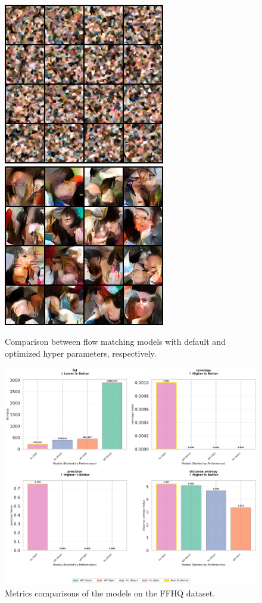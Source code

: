 \documentclass{article}
\begin{document}
\begin{figure}[tb]
    \includegraphics[width=0.5\linewidth]{images/generated_samples/flow_matching_ffhq_default_epoch=981-train_loss=0.24.ckpt_final_images}
    \includegraphics[width=0.5\linewidth]{images/generated_samples/flow_matching_ffhq_optim_epoch=35-train_loss=0.16.ckpt_final_images}
    \caption{Comparison between flow matching models with default and optimized hyper parameters, respectively.}
    \label{fig:flow_matching}
\end{figure}

\begin{figure}[tb]
    \includegraphics[width=\linewidth]{images/final_results/selected_metrics_comparison}
    \caption{Metrics comparisons of the models on the FFHQ dataset.}
    \label{fig:metrics}
\end{figure}
\end{document}
